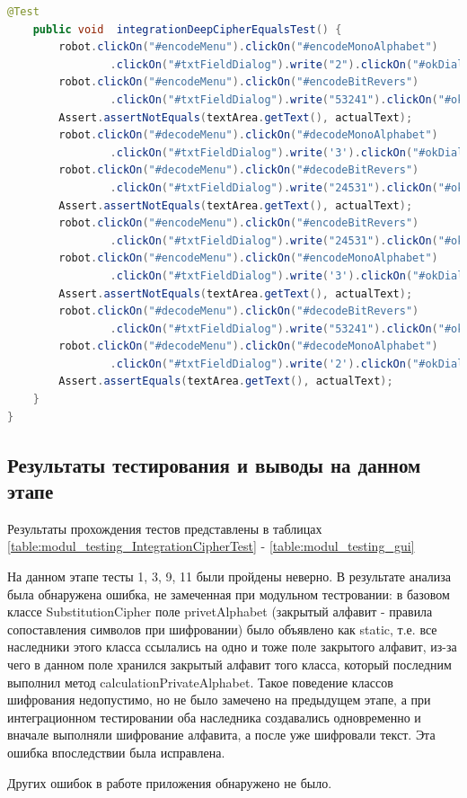 \documentclass[a4paper,12pt]{article}
\begin{document}
\begin{lstlisting}[language=java, caption=класс MainWindowUiIntegrationTest, label=listing_mainWindow:MainWindowUiIntegrationTestn]
    @Test
    public void  integrationDeepCipherEqualsTest() {
        robot.clickOn("#encodeMenu").clickOn("#encodeMonoAlphabet")
                .clickOn("#txtFieldDialog").write("2").clickOn("#okDialog");
        robot.clickOn("#encodeMenu").clickOn("#encodeBitRevers")
                .clickOn("#txtFieldDialog").write("53241").clickOn("#okDialog");
        Assert.assertNotEquals(textArea.getText(), actualText);
        robot.clickOn("#decodeMenu").clickOn("#decodeMonoAlphabet")
                .clickOn("#txtFieldDialog").write('3').clickOn("#okDialog");
        robot.clickOn("#decodeMenu").clickOn("#decodeBitRevers")
                .clickOn("#txtFieldDialog").write("24531").clickOn("#okDialog");
        Assert.assertNotEquals(textArea.getText(), actualText);
        robot.clickOn("#encodeMenu").clickOn("#encodeBitRevers")
                .clickOn("#txtFieldDialog").write("24531").clickOn("#okDialog");
        robot.clickOn("#encodeMenu").clickOn("#encodeMonoAlphabet")
                .clickOn("#txtFieldDialog").write('3').clickOn("#okDialog");
        Assert.assertNotEquals(textArea.getText(), actualText);
        robot.clickOn("#decodeMenu").clickOn("#decodeBitRevers")
                .clickOn("#txtFieldDialog").write("53241").clickOn("#okDialog");
        robot.clickOn("#decodeMenu").clickOn("#decodeMonoAlphabet")
                .clickOn("#txtFieldDialog").write('2').clickOn("#okDialog");
        Assert.assertEquals(textArea.getText(), actualText);
    }
}
\end{lstlisting}

\subsection{Результаты тестирования и выводы на данном этапе}

Результаты прохождения тестов представлены в таблицах \ref{table:modul_testing_IntegrationCipherTest} - \ref{table:modul_testing_gui}

На данном этапе тесты 1, 3, 9, 11 были пройдены неверно.
В результате анализа  была обнаружена ошибка, не замеченная при модульном тестровании: в базовом классе SubstitutionCipher поле privetAlphabet (закрытый алфавит - правила сопоставления символов при шифровании) было объявлено как static, т.е. все наследники этого класса ссылались на одно и тоже поле закрытого алфавит, из-за чего в данном поле хранился закрытый алфавит того класса, который последним выполнил метод calculationPrivateAlphabet. Такое поведение классов шифрования недопустимо, но не было замечено на предыдущем этапе, а при интеграционном тестировании оба наследника создавались одновременно и вначале выполняли шифрование алфавита, а после уже шифровали текст. Эта ошибка впоследствии была исправлена.
\par Других ошибок в работе приложения обнаружено не было.
\end{document}
